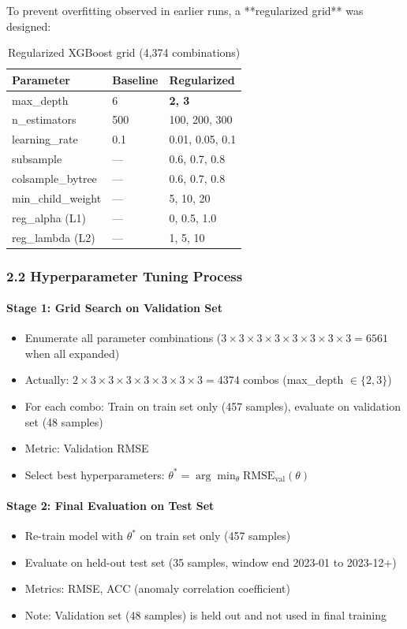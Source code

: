 \documentclass[12pt,a4paper]{article}
\begin{document}
To prevent overfitting observed in earlier runs, a **regularized grid** was designed:

\begin{table}[H]
\centering
\begin{tabular}{lll}
\toprule
\textbf{Parameter} & \textbf{Baseline} & \textbf{Regularized} \\
\midrule
max\_depth & 6 & \textbf{2, 3} \\
n\_estimators & 500 & 100, 200, 300 \\
learning\_rate & 0.1 & 0.01, 0.05, 0.1 \\
subsample & — & 0.6, 0.7, 0.8 \\
colsample\_bytree & — & 0.6, 0.7, 0.8 \\
min\_child\_weight & — & 5, 10, 20 \\
reg\_alpha (L1) & — & 0, 0.5, 1.0 \\
reg\_lambda (L2) & — & 1, 5, 10 \\
\bottomrule
\end{tabular}
\caption{Regularized XGBoost grid (4,374 combinations)}
\end{table}

\subsubsection*{2.2 Hyperparameter Tuning Process}

\paragraph{Stage 1: Grid Search on Validation Set}
\begin{itemize}
    \item Enumerate all parameter combinations ($3 \times 3 \times 3 \times 3 \times 3 \times 3 \times 3 \times 3 = 6561$ when all expanded)
    \item Actually: $2 \times 3 \times 3 \times 3 \times 3 \times 3 \times 3 \times 3 = 4374$ combos (max\_depth $\in \{2, 3\}$)
    \item For each combo: Train on train set only (457 samples), evaluate on validation set (48 samples)
    \item Metric: Validation RMSE
    \item Select best hyperparameters: $\theta^* = \arg\min_\theta \text{RMSE}_{\text{val}}(\theta)$
\end{itemize}

\paragraph{Stage 2: Final Evaluation on Test Set}
\begin{itemize}
    \item Re-train model with $\theta^*$ on train set only (457 samples)
    \item Evaluate on held-out test set (35 samples, window end 2023-01 to 2023-12+)
    \item Metrics: RMSE, ACC (anomaly correlation coefficient)
    \item Note: Validation set (48 samples) is held out and not used in final training
\end{itemize}
\end{document}
